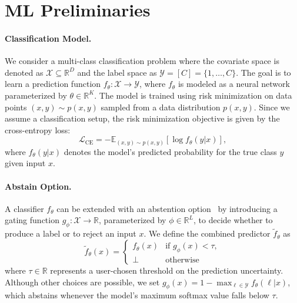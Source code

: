 \section{ML Preliminaries}

\paragraph{Classification Model.} We consider a multi-class classification problem where the covariate space is denoted as \(\mathcal{X} \subseteq \mathbb{R}^D\) and the label space as \(\mathcal{Y} = [C] = \{1, \dots, C\}\). The goal is to learn a prediction function \(f_\theta: \mathcal{X} \to \mathcal{Y}\), where \(f_\theta\) is modeled as a neural network parameterized by \(\theta \in \mathbb{R}^K\). The model is trained using risk minimization on data points \((x, y) \sim p(x, y) \) sampled from a data distribution \(p(x, y)\). Since we assume a classification setup, the risk minimization objective is given by the cross-entropy loss:
\begin{equation}
     \mathcal{L}_\text{CE} = - \mathbb{E}_{(x,y) \sim p(x, y)} [\log f_\theta(y | x)],
\end{equation}
where \(f_\theta(y|x)\) denotes the model's predicted probability for the true class $y$ given input \(x\). %

\paragraph{Abstain Option.} A classifier $f_\theta$ can be extended with an abstention option~\citep{el2010foundations} by introducing a gating function \(g_\phi : \mathcal{X} \to \mathbb{R}\), parameterized by \(\phi \in \mathbb{R}^L\), to decide whether to produce a label or to reject an input $x$. We define the combined predictor \(\tilde{f}_\theta\) as
\begin{equation}\label{eq:gating}
\tilde{f}_\theta(x) = 
\begin{cases}
f_\theta(x) & \text{if } g_\phi(x) < \tau,\\
\bot & \text{otherwise}
\end{cases}
\end{equation}
where $\tau \in \mathbb{R}$ represents a user-chosen threshold on the prediction uncertainty. Although other choices are possible, we set \(g_\phi(x) = 1 - \max_{\ell \in \mathcal{Y}} f_\theta(\ell|x)\), which abstains whenever the model’s maximum softmax value falls below \(\tau\).

